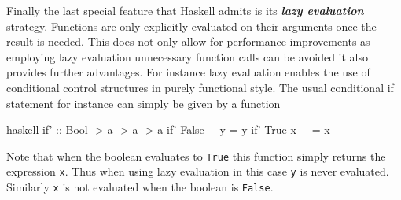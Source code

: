 \documentclass[a4paper,12pt, DIV=14, BCOR=5mm, twoside, headsepline, numbers=noenddot]{scrbook}
\begin{document}
Finally the last special feature that Haskell admits is its \textit{\textbf{lazy evaluation}} strategy. Functions are only explicitly evaluated on their arguments once the result is needed. This does not only allow for performance improvements as employing lazy evaluation unnecessary function calls can be avoided it also provides further advantages. For instance lazy evaluation enables the use of conditional control structures in purely functional style. The usual conditional if statement for instance can simply be given by a function
\begin{center}
\begin{cminted}{haskell}
if' :: Bool -> a -> a -> a
if' False _ y = y 
if' True x _ = x 
\end{cminted}
\end{center}
Note that when the boolean evaluates to \texttt{True} this function simply returns the expression \texttt{x}. Thus when using lazy evaluation in this case \texttt{y} is never evaluated. Similarly \texttt{x} is not evaluated when the boolean is \texttt{False}. 
\end{document}
